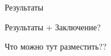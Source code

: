 
\begin{frame}{Результаты}
	\begin{center}
		Результаты + Заключение?

		Что можно тут разместить??
	\end{center}
\end{frame}
